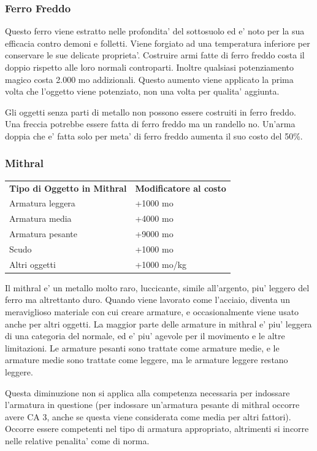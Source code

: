 \documentclass[a4paper,11pt,twoside,openany]{book}
\begin{document}
{		\subsubsection{Ferro Freddo}
		
		\label{ferro-freddo}
		
		Questo ferro viene estratto nelle profondita' del sottosuolo ed e' noto per la sua efficacia contro demoni e folletti. Viene forgiato ad una temperatura inferiore per conservare le sue delicate proprieta'. Costruire armi fatte di ferro freddo costa il doppio rispetto alle loro normali controparti. Inoltre qualsiasi potenziamento magico costa 2.000 mo addizionali. Questo aumento viene applicato la prima volta che l'oggetto viene potenziato, non una volta per qualita' aggiunta. 
		
		Gli oggetti senza parti di metallo non possono essere costruiti in ferro freddo. Una freccia potrebbe essere fatta di ferro freddo ma un randello no. Un'arma doppia che e' fatta solo per meta' di ferro freddo aumenta il suo costo del 50\%.
		
		\subsubsection{Mithral}
		
		\label{mithral}
		
		\begin{tabular}{ll}
			\toprule
			\textbf{Tipo di Oggetto in Mithral} & \textbf{Modificatore al costo}\tabularnewline
			Armatura leggera & +1000 mo\tabularnewline
			Armatura media & +4000 mo\tabularnewline
			Armatura pesante & +9000 mo\tabularnewline
			Scudo & +1000 mo\tabularnewline
			Altri oggetti & +1000 mo/kg\tabularnewline
		\end{tabular}
		
		\bigskip
		
		Il mithral e' un metallo molto raro, luccicante, simile all'argento, piu' leggero del ferro ma altrettanto duro. Quando viene lavorato come l'acciaio, diventa un meraviglioso materiale con cui creare armature, e occasionalmente viene usato anche per altri oggetti. La maggior parte delle armature in mithral e' piu' leggera di una categoria del normale, ed e' piu' agevole per il movimento e le altre limitazioni. Le armature pesanti sono trattate come armature medie, e le armature medie sono trattate come leggere, ma le armature leggere restano leggere.
		
		Questa diminuzione non si applica alla competenza necessaria per indossare l'armatura in questione (per indossare un'armatura pesante di mithral occorre avere CA 3, anche se questa viene considerata come media per altri fattori). Occorre essere competenti nel tipo di armatura appropriato, altrimenti si incorre nelle relative penalita' come di norma.
		
}
\end{document}
